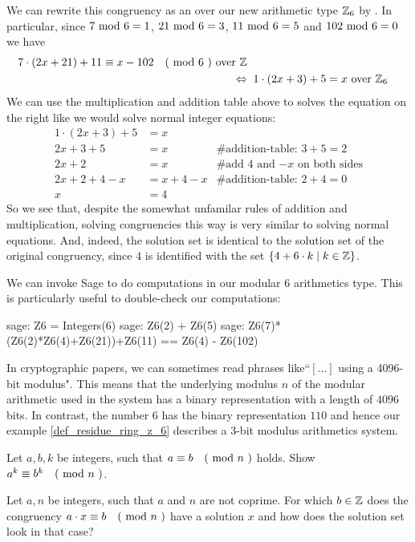 \begin{example} 
We can rewrite this congruency as an  over our new arithmetic type $\mathbb{Z}_6$ by . In particular, since $7 \text{ mod } 6= 1$, $21 \text{ mod } 6= 3$, $11 \text{ mod } 6= 5$ and $102 \text{ mod } 6= 0$ we have
\begin{align*}
7\cdot(2x+21) + 11 \equiv x-102 \quad \text{( mod } 6 \text{ )} \text{ over } \mathbb{Z}\\ 
\Leftrightarrow & \; \; 1\cdot (2x+3) + 5 = x \text{ over } \mathbb{Z}_6
\end{align*}
We can use the multiplication and addition table above to solves the equation on the right like we would solve normal integer equations:  
\begin{align*}
1\cdot (2x+3) + 5 &= x & \text{ }\\
2x+3 + 5 &= x & \text{\# addition-table: } 3+5 = 2 \\
2x+2 &= x & \text{\# add 4 and $-x$ on both sides} \\
2x+2 +4 -x &= x + 4 -x & \text{\# addition-table: } 2+4 = 0 \\
x &= 4 &
\end{align*}
So we see that, despite the somewhat unfamilar rules of addition and multiplication, solving congruencies this way is very similar to solving normal equations. And, indeed, the solution set is identical to the solution set of the original congruency, since $4$ is identified with the set $\{4+6\cdot k\;|\; k\in\mathbb{Z}\}$.

We can invoke Sage to do computations in our modular $6$ arithmetics type. This is particularly useful to double-check our computations:
\begin{sagecommandline}
sage: Z6 = Integers(6)
sage: Z6(2) + Z6(5)
sage: Z6(7)*(Z6(2)*Z6(4)+Z6(21))+Z6(11) == Z6(4) - Z6(102)
\end{sagecommandline}
\end{example}

\begin{jargon} In cryptographic papers, we can sometimes read phrases like``$[\ldots]$ using a 4096-bit modulus". This means that the underlying modulus $n$ of the modular arithmetic used in the system has a binary representation with a length of $4096$ bits. In contrast, the number $6$ has the binary representation $110$ and hence our example \ref{def_residue_ring_z_6}
 describes a $3$-bit modulus arithmetics system.   
\end{jargon}
\begin{exercise}
Let $a,b,k$ be integers, such that $a \equiv b \quad \text{( mod } n \text{ )}$ holds. Show $a^k \equiv b^k \quad \text{( mod } n \text{ )}$.
\end{exercise}
\begin{exercise}
Let $a,n$ be integers, such that $a$ and $n$ are not coprime. For which $b\in\mathbb{Z}$ does the 
congruency $a\cdot x \equiv b \quad \text{( mod } n \text{ )}$ have a solution $x$ and how does the solution set look in that case?
\end{exercise}
